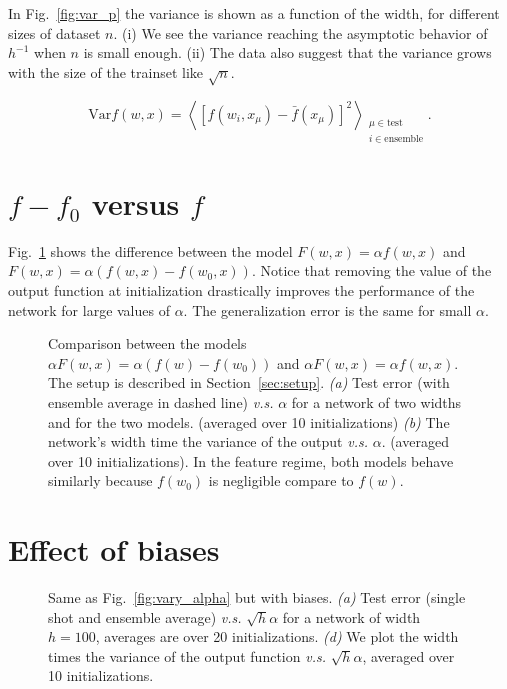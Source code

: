\documentclass{article}
\newcommand{\be}{\begin{equation}}
\newcommand{\ee}{\end{equation}}
\newcommand{\mr}{\mathrm}
\newcommand{\sref}[1]{Section~\ref{#1}}
\newcommand{\fref}[1]{Fig.~\ref{#1}}
\begin{document}
In \fref{fig:var_p} the variance is shown as a function of the width, for different sizes of dataset $n$. 
(i) We see the variance reaching the asymptotic behavior of $h^{-1}$ when $n$ is small enough.
(ii) The data also suggest that the variance grows with the size of the trainset like $\sqrt{n}$.

\be
\mr{Var}f(w,x) = \left\langle \left[f(w_i,x_\mu) - \bar{f}(x_\mu)\right]^2 \right\rangle_{\substack{ \mu\in\mr{test} \\ i\in\mr{ensemble} }}\!\!\!.
\ee



\section{$f - f_0$ versus $f$}
\label{sec:alphaf}
\fref{fig:alphaf} shows the difference between the model $F(w,x) = \alpha f(w,x)$ and $F(w,x) = \alpha (f(w,x) - f(w_0,x))$. Notice that removing the value of the output function at initialization drastically improves the performance of the network for large values of $\alpha$. The generalization error is the same for small $\alpha$.

\begin{figure}[ht]
    \centering
    \caption{\label{fig:alphaf}Comparison between the models $\alpha F(w,x) = \alpha(f(w) - f(w_0))$ and $\alpha F(w,x)=\alpha f(w,x)$. The setup is described in \sref{sec:setup}. \emph{(a)} Test error (with ensemble average in dashed line) \textit{v.s.} $\alpha$ for a network of two widths and for the two models. (averaged over 10 initializations) \emph{(b)} The network's width time the variance of the output \textit{v.s.} $\alpha$. (averaged over 10 initializations).
    In the feature regime, both models behave similarly because $f(w_0)$ is negligible compare to $f(w)$.}
\end{figure}


\section{Effect of biases}
\label{sec:bias}

\begin{figure}[ht]
    \centering
    \caption{\label{fig:bias}Same as \fref{fig:vary_alpha} but with biases. \emph{(a)} Test error (single shot and ensemble average) \textit{v.s.} $\sqrt{h} \alpha$ for a network of width $h=100$, averages are over 20 initializations. \emph{(d)} We plot the width times the variance of the output function \textit{v.s.} $\sqrt{h} \alpha$, averaged over 10 initializations.}
\end{figure}
\end{document}
